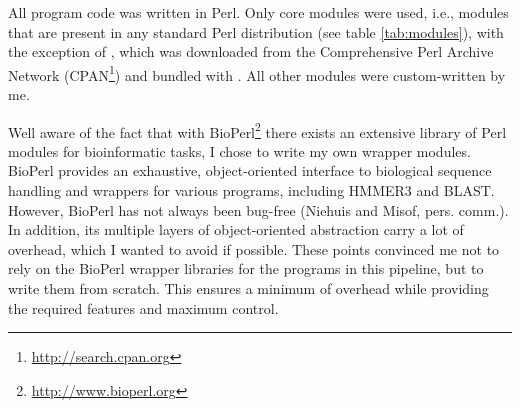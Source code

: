 All program code was written in Perl. Only core modules were used, i.e., modules
that are present in any standard Perl distribution (see table \ref{tab:modules}),
with the exception of  \citep{shan2001}, which was downloaded from
the Comprehensive Perl Archive Network
(CPAN\footnote{\url{http://search.cpan.org}}) and bundled with \pname. All other
modules were custom-written by me.



Well aware of the fact that with BioPerl\footnote{\url{http://www.bioperl.org}}
there exists an extensive library of Perl modules for bioinformatic tasks, I
chose to write my own wrapper modules. BioPerl provides an exhaustive,
object-oriented interface to biological sequence handling and wrappers for
various programs, including HMMER3 and BLAST. However, BioPerl has not always
been bug-free (Niehuis and Misof, pers. comm.). In addition, its multiple layers
of object-oriented abstraction carry a lot of overhead, which I wanted to avoid
if possible. These points convinced me not to rely on the BioPerl wrapper
libraries for the programs in this pipeline, but to write them from scratch.
This ensures a minimum of overhead while providing the required features and
maximum control.
